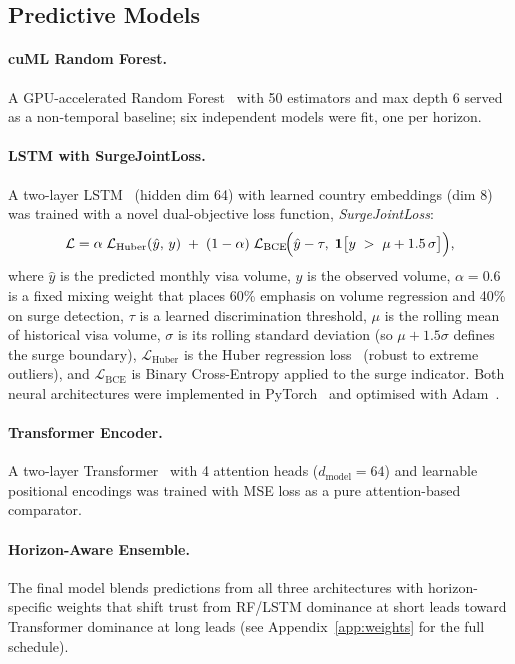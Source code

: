 \documentclass[11pt, a4paper]{article}
\begin{document}
\subsection{Predictive Models}

\paragraph{cuML Random Forest.}
A GPU-accelerated Random Forest~\citep{breiman2001,rapids_cuml} with 50 estimators and
max depth 6 served as a non-temporal baseline; six independent models were fit, one per
horizon.

\paragraph{LSTM with SurgeJointLoss.}
A two-layer LSTM~\citep{hochreiter1997} (hidden dim 64) with learned country embeddings
(dim 8) was trained with a novel dual-objective loss function, \textit{SurgeJointLoss}:
\begin{equation}
  \mathcal{L} = \alpha\;\mathcal{L}_{\mathrm{Huber}}(\hat{y},\, y)
  \;+\; (1-\alpha)\;\mathcal{L}_{\mathrm{BCE}}\!\Bigl(
    \hat{y} - \tau,\;
    \mathbf{1}\bigl[y \;>\; \mu + 1.5\,\sigma\bigr]
  \Bigr),
  \label{eq:surge_loss}
\end{equation}
where $\hat{y}$ is the predicted monthly visa volume, $y$ is the observed volume,
$\alpha = 0.6$ is a fixed mixing weight that places 60\% emphasis on volume regression
and 40\% on surge detection, $\tau$ is a learned discrimination threshold,
$\mu$ is the rolling mean of historical visa volume, $\sigma$ is its rolling standard
deviation (so $\mu + 1.5\sigma$ defines the surge boundary), $\mathcal{L}_{\mathrm{Huber}}$
is the Huber regression loss~\citep{huber1964} (robust to extreme outliers), and
$\mathcal{L}_{\mathrm{BCE}}$ is Binary Cross-Entropy applied to the surge indicator.
Both neural architectures were implemented in PyTorch~\citep{pytorch} and optimised
with Adam~\citep{kingma2015}.

\paragraph{Transformer Encoder.}
A two-layer Transformer~\citep{vaswani2017,pytorch} with 4 attention heads
($d_{\text{model}}=64$) and learnable positional encodings was trained with MSE loss as
a pure attention-based comparator.

\paragraph{Horizon-Aware Ensemble.}
The final model blends predictions from all three architectures with horizon-specific
weights that shift trust from RF/LSTM dominance at short leads toward Transformer
dominance at long leads (see Appendix~\ref{app:weights} for the full schedule).
\end{document}
